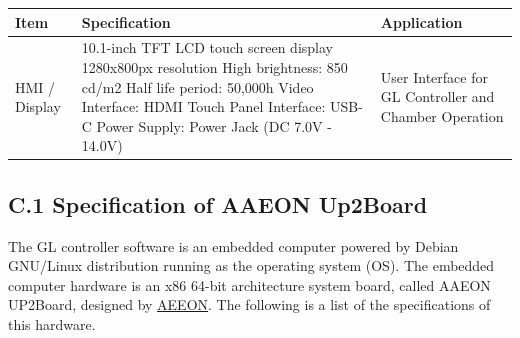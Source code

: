 \begin{longtable}[]{@{}lll@{}}
\toprule
\begin{minipage}[b]{0.17\columnwidth}\raggedright
Item\strut
\end{minipage} & \begin{minipage}[b]{0.41\columnwidth}\raggedright
Specification\strut
\end{minipage} & \begin{minipage}[b]{0.33\columnwidth}\raggedright
Application\strut
\end{minipage}\tabularnewline
\midrule
\endhead
\begin{minipage}[t]{0.17\columnwidth}\raggedright
HMI / Display\strut
\end{minipage} & \begin{minipage}[t]{0.41\columnwidth}\raggedright
10.1-inch TFT LCD touch screen display 1280x800px resolution High
brightness: 850 cd/m2 Half life period: 50,000h Video Interface: HDMI
Touch Panel Interface: USB-C Power Supply: Power Jack (DC 7.0V -
14.0V)\strut
\end{minipage} & \begin{minipage}[t]{0.33\columnwidth}\raggedright
User Interface for GL Controller and Chamber Operation\strut
\end{minipage}\tabularnewline
\bottomrule
\end{longtable}


\subsection{C.1 Specification of AAEON
Up2Board}

The GL controller software is an embedded computer powered by Debian
GNU/Linux distribution running as the operating system (OS). The
embedded computer hardware is an x86 64-bit architecture system board,
called AAEON UP2Board, designed by
\href{https://www.aaeon.com/en/product/detail/iot-gateway-maker-boards-up-squared/specification}{AEEON}.
The following is a list of the specifications of this hardware.

